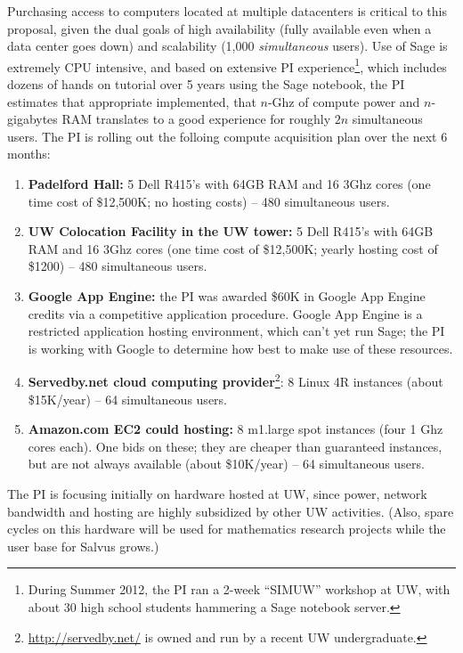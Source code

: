 \documentclass[11pt]{article}
\begin{document}
Purchasing access to computers located at multiple datacenters is
critical to this proposal, given the dual goals of high availability
(fully available even when a data center goes down) and scalability
(1,000 {\em simultaneous} users).  Use of Sage is extremely CPU
intensive, and based on extensive PI experience\footnote{During Summer
  2012, the PI ran a 2-week ``SIMUW'' workshop at UW, with about 30
  high school students hammering a Sage notebook server.}, which
includes dozens of hands on tutorial over 5 years using the Sage
notebook, the PI estimates that appropriate implemented, that $n$-Ghz
of compute power and $n$-gigabytes RAM translates to a good experience
for roughly $2n$ simultaneous users.  The PI is rolling out the
folloing compute acquisition plan over the next 6 months:

\begin{enumerate}
\item {\bf Padelford Hall:} 5 Dell R415's with 64GB RAM
  and 16 3Ghz cores (one time cost of \$12,500K; no hosting costs) --
  480 simultaneous users. 

\item {\bf UW Colocation Facility in the UW tower:} 5 Dell R415's with
  64GB RAM and 16 3Ghz cores (one time cost of \$12,500K; yearly
  hosting cost of \$1200) -- 480 simultaneous users. 

\item {\bf Google App Engine:} the PI was awarded \$60K in Google App
  Engine credits via a competitive application procedure.  Google App
  Engine is a restricted application hosting environment, which can't
  yet run Sage; the PI is working with Google to determine how best to
  make use of these resources.

\item {\bf Servedby.net cloud computing
  provider}\footnote{\url{http://servedby.net/} is owned and run by a
  recent UW undergraduate.}: 8 Linux 4R instances (about \$15K/year)
  -- 64 simultaneous users.

\item {\bf Amazon.com EC2 could hosting:} 8 m1.large spot instances
  (four 1 Ghz cores each).  One bids on these; they are cheaper than
  guaranteed instances, but are not always available (about
  \$10K/year) -- 64 simultaneous users.

\end{enumerate}

The PI is focusing initially on hardware hosted at UW, since power,
network bandwidth and hosting are highly subsidized by other UW
activities.  (Also, spare cycles on this hardware will be used for
mathematics research projects while the user base for Salvus grows.)
\end{document}
